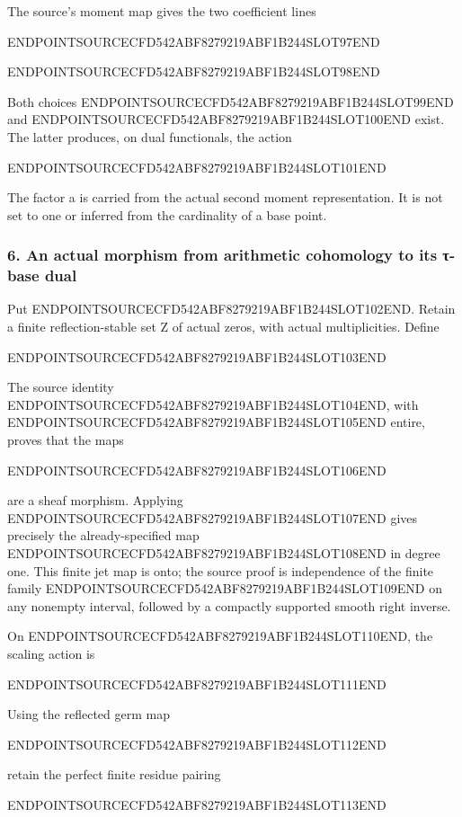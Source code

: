 The source's moment map gives the two coefficient lines

ENDPOINTSOURCECFD542ABF8279219ABF1B244SLOT97END

ENDPOINTSOURCECFD542ABF8279219ABF1B244SLOT98END

Both choices ENDPOINTSOURCECFD542ABF8279219ABF1B244SLOT99END and ENDPOINTSOURCECFD542ABF8279219ABF1B244SLOT100END exist. The latter produces, on dual functionals, the action

ENDPOINTSOURCECFD542ABF8279219ABF1B244SLOT101END

The factor a is carried from the actual second moment representation. It is not set to one or inferred from the cardinality of a base point.

\subsubsection{6. An actual morphism from arithmetic cohomology to its τ-base dual}\label{endpoint-tau_base--an-actual-morphism-from-arithmetic-cohomology-to-its-ux3c4-base-dual}

Put ENDPOINTSOURCECFD542ABF8279219ABF1B244SLOT102END. Retain a finite reflection-stable set Z of actual zeros, with actual multiplicities. Define

ENDPOINTSOURCECFD542ABF8279219ABF1B244SLOT103END

The source identity ENDPOINTSOURCECFD542ABF8279219ABF1B244SLOT104END, with ENDPOINTSOURCECFD542ABF8279219ABF1B244SLOT105END entire, proves that the maps

ENDPOINTSOURCECFD542ABF8279219ABF1B244SLOT106END

are a sheaf morphism. Applying ENDPOINTSOURCECFD542ABF8279219ABF1B244SLOT107END gives precisely the already-specified map ENDPOINTSOURCECFD542ABF8279219ABF1B244SLOT108END in degree one. This finite jet map is onto; the source proof is independence of the finite family ENDPOINTSOURCECFD542ABF8279219ABF1B244SLOT109END on any nonempty interval, followed by a compactly supported smooth right inverse.

On ENDPOINTSOURCECFD542ABF8279219ABF1B244SLOT110END, the scaling action is

ENDPOINTSOURCECFD542ABF8279219ABF1B244SLOT111END

Using the reflected germ map

ENDPOINTSOURCECFD542ABF8279219ABF1B244SLOT112END

retain the perfect finite residue pairing

ENDPOINTSOURCECFD542ABF8279219ABF1B244SLOT113END

